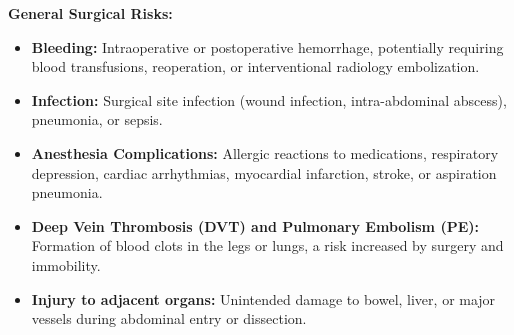 \textbf{General Surgical Risks:}
\begin{itemize}
  \item \textbf{Bleeding:} Intraoperative or postoperative hemorrhage, potentially requiring blood transfusions, reoperation, or interventional radiology embolization.
  \item \textbf{Infection:} Surgical site infection (wound infection, intra-abdominal abscess), pneumonia, or sepsis.
  \item \textbf{Anesthesia Complications:} Allergic reactions to medications, respiratory depression, cardiac arrhythmias, myocardial infarction, stroke, or aspiration pneumonia.
  \item \textbf{Deep Vein Thrombosis (DVT) and Pulmonary Embolism (PE):} Formation of blood clots in the legs or lungs, a risk increased by surgery and immobility.
  \item \textbf{Injury to adjacent organs:} Unintended damage to bowel, liver, or major vessels during abdominal entry or dissection.
\end{itemize}

